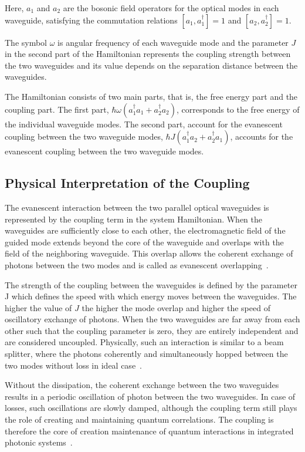 Here, $a_1$ and $a_2$ are the bosonic field operators for the optical modes in each waveguide, satisfying the commutation relations
$[a_1, a_1^{\dagger}] = 1$ and $[a_2, a_2^{\dagger}] = 1$.

The symbol $\omega$ is angular frequency of each waveguide mode and the parameter $J$ in the second part of the Hamiltonian represents the coupling strength between the two waveguides and its value depends on the separation distance between the waveguides.

The Hamiltonian consists of two main parts, that is, the free energy part and the coupling part. The first part, $\hbar \omega \left(a_1^{\dagger} a_1 + a_2^{\dagger} a_2\right)$, corresponds to the free energy of the individual waveguide modes.  The second part, account for the evanescent coupling between the two waveguide modes,
$\hbar J \left(a_1^{\dagger} a_2 + a_2^{\dagger} a_1\right)$, accounts for the evanescent coupling between the two waveguide modes.

\subsection{Physical Interpretation of the Coupling}

The evanescent interaction between the two parallel optical waveguides is represented by the coupling term in the system Hamiltonian. When the waveguides are sufficiently close to each other, the electromagnetic field of the guided mode extends beyond the core of the waveguide and overlaps with the field of the neighboring waveguide.  This overlap allows the coherent exchange of photons between the two modes and is called as evanescent overlapping~\cite{Yariv1973,SalehTeich2007}.

The strength of the coupling between the waveguides is defined by the parameter J which defines the speed with which energy moves between the waveguides. The higher the value of $J$ the higher the mode overlap and higher the speed of oscillatory exchange of photons. When the two waveguides are far away from each other such that the coupling parameter is zero, they are entirely independent and are considered uncoupled. Physically, such an interaction is similar to a beam splitter, where the photons coherently and simultaneously hopped between the two modes without loss in ideal case~\cite{Yariv1973,Rai2010,Politi2008}.

Without the dissipation, the coherent exchange between the two waveguides results in a periodic oscillation of photon between the two waveguides. In case of losses, such oscillations are slowly damped, although the coupling term still plays the role of creating and maintaining quantum correlations. The coupling is therefore the core of creation maintenance of quantum interactions in integrated photonic systems~\cite{Rai2010,Yariv1973}.

